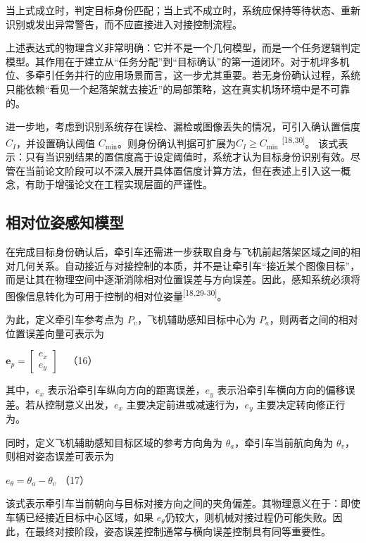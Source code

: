 当上式成立时，判定目标身份匹配；当上式不成立时，系统应保持等待状态、重新识别或发出异常警告，而不应直接进入对接控制流程。

上述表达式的物理含义非常明确：它并不是一个几何模型，而是一个任务逻辑判定模型。其作用在于建立从``任务分配''到``目标确认''的第一道闭环。对于机坪多机位、多牵引任务并行的应用场景而言，这一步尤其重要。若无身份确认过程，系统只能依赖``看见一个起落架就去接近''的局部策略，这在真实机场环境中是不可靠的。

进一步地，考虑到识别系统存在误检、漏检或图像丢失的情况，可引入确认置信度
\(C_{I}\)，并设置确认阈值
\(C_{\min}\)。则身份确认判据可扩展为\(C_{I} \geq C_{\min}\)
\textsuperscript{[18,30]}。\(
\)
该式表示：只有当识别结果的置信度高于设定阈值时，系统才认为目标身份识别有效。尽管在当前论文阶段可以不深入展开具体置信度计算方法，但在表述上引入这一概念，有助于增强论文在工程实现层面的严谨性。

\subsection{相对位姿感知模型}

在完成目标身份确认后，牵引车还需进一步获取自身与飞机前起落架区域之间的相对几何关系。自动接近与对接控制的本质，并不是让牵引车``接近某个图像目标''，而是让其在物理空间中逐渐消除相对位置误差与方向误差。因此，感知系统必须将图像信息转化为可用于控制的相对位姿量\textsuperscript{[18,29-30]}。

为此，定义牵引车参考点为 \(P_{v}\)，飞机辅助感知目标中心为
\(P_{a}\)，则两者之间的相对位置误差向量可表示为

\(\mathbf{e}_{p} = \left\lbrack \begin{array}{r}
e_{x} \\
e_{y}
\end{array} \right\rbrack\ \ \ \) （16）

其中，\(e_{x}\) 表示沿牵引车纵向方向的距离误差，\(e_{y}\)
表示沿牵引车横向方向的偏移误差。若从控制意义出发，\(e_{x}\)
主要决定前进或减速行为，\(e_{y}\) 主要决定转向修正行为。

同时，定义飞机辅助感知目标区域的参考方向角为
\(\theta_{a}\)，牵引车当前航向角为
\(\theta_{v}\)，则相对姿态误差可表示为

\(e_{\theta} = \theta_{a} - \theta_{v}\) （17）

该式表示牵引车当前朝向与目标对接方向之间的夹角偏差。其物理意义在于：即使车辆已经接近目标中心区域，如果
\(e_{\theta}\)仍较大，则机械对接过程仍可能失败。因此，在最终对接阶段，姿态误差控制通常与横向误差控制具有同等重要性。

